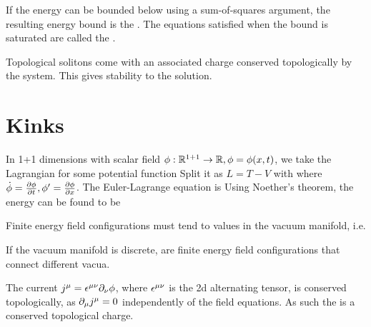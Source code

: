\documentclass{article}
\begin{document}
\begin{definition}
If the energy can be bounded below using a sum-of-squares argument, the resulting energy bound is the . The equations satisfied when the bound is saturated are called the .
\end{definition}

\begin{definition}
Topological solitons come with an associated charge conserved topologically by the system. This gives stability to the solution. 
\end{definition}

\section{Kinks}

In 1+1 dimensions with scalar field $\phi:\mbb{R}^{1+1} \to \mbb{R}, \phi=\phi(x,t)$, we take the Lagrangian 
for some potential function Split it as $L=T-V$ with 
where $\dot{\phi} = \pd[\phi]{t}, \phi^\prime = \pd[\phi]{x}$. The Euler-Lagrange equation is 
Using Noether's theorem, the energy can be found to be 

\begin{prop}
Finite energy field configurations must tend to values in the vacuum manifold, i.e. 
\end{prop}

\begin{definition}[Kinks]
If the vacuum manifold is discrete,  are finite energy field configurations that connect different vacua. 
\end{definition}

\begin{definition}
The current $j^\mu = \eps^{\mu\nu}\del_\nu \phi$, where $\eps^{\mu\nu}$ is the 2d alternating tensor, is conserved topologically, as $\del_\mu j^\mu = 0$ independently of the field equations. As such the 
is a conserved topological charge.
\end{definition}
\end{document}
